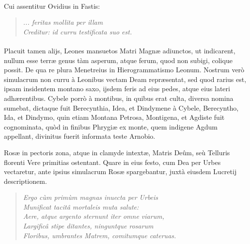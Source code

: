 \documentclass[a4paper, 11pt, oneside, polutonikogreek, latin]{article}
\begin{document}
\paragraph{}
Cui assentitur Ovidius in Fastis:
\begin{quote}
\emph{... feritas mollita per illam}\\
\emph{Creditur: id curru testificata suo est.}\\
\end{quote}
\vspace*{-8mm}
\paragraph{}
Placuit tamen alijs, Leones mansuetos Matri Magnæ adiunctos, ut indicarent, nullum esse terræ genus tàm asperum, atque ferum, quod non subigi, colique possit. De qua re plura Menetreius in Hierogrammatismo Leonum. Nostrum verò simulacrum non curru à Leonibus vectam Deam repræsentat, sed quod rarius est, ipsam insidentem montano saxo, ijsdem feris ad eius pedes, atque eius lateri adhærentibus. Cybele porrò à montibus, in quibus erat culta, diversa nomina sumebat, dictaque fuit Berecynthia, Idea, et Dindymene à Cybele, Berecyntho, Ida, et Dindymo, quin etiam Montana Petrosa, Montigena, et Agdiste fuit cognominata, quòd in finibus Phrygiæ ex monte, quem indigene Agdum appellant, divinitus fuerit informata teste Arnobio.

Rosæ in pectoris zona, atque in clamyde intextæ, Matris Deûm, seù Telluris florenti Vere primitias ostentant. Quare in eius festo, cum Dea per Urbes vectaretur, ante ipsius simulacrum Rosæ spargebantur, juxtà eiusdem Lucretij descriptionem.
\begin{quote}
\emph{Ergo cùm primùm magnas inuecta per Urbeis}\\
\emph{Munificat tacitâ mortaleis muta salute:}\\
\emph{Aere, atque argento sternunt iter omne viarum,}\\
\emph{Largificâ stipe ditantes, ninguntque rosarum}\\
\emph{Floribus, umbrantes Matrem, comitumque cateruas.}\\
\end{quote}
\vspace*{-8mm}
\end{document}
